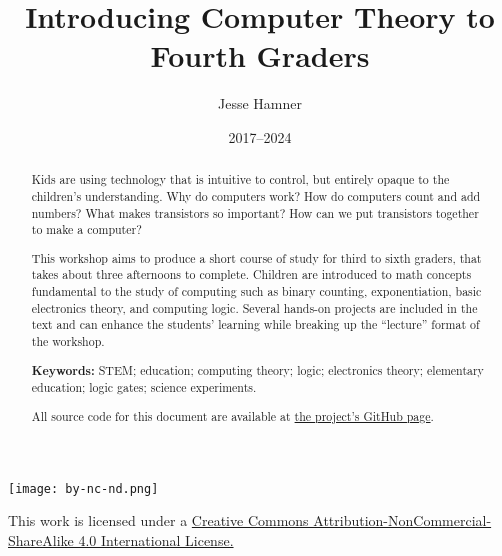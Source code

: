 \documentclass[12pt]{article}
\begin{document}

\thispagestyle{empty}

\title{Introducing Computer Theory to Fourth Graders}
\author{Jesse Hamner}
\date{2017--2024}

\maketitle

\begin{abstract}
Kids are using technology that is intuitive to control, but entirely opaque to the children's understanding. Why do computers work? How do computers count and add numbers? What makes transistors so important? How can we put transistors together to make a computer? 

This workshop aims to produce a short course of study for third to sixth graders, that takes about three afternoons to complete. Children are introduced to math concepts fundamental to the study of computing such as binary counting, exponentiation, basic electronics theory, and computing logic. Several hands-on projects are included in the text and can enhance the students' learning while breaking up the ``lecture'' format of the workshop.

\bigskip

\noindent\textbf{Keywords:} STEM; education; computing theory; logic; electronics theory; elementary education; logic gates; science experiments.

\bigskip

\noindent All source code for this document are available at {\color{webblue}\href{https://github.com/jessehamner/TechMillForKids}{the project's GitHub page}}.

\end{abstract}

\vfill

\begin{center}
\texttt{[image: by-nc-nd.png]}

This work is licensed under a {\color{webblue}\href{https://creativecommons.org/licenses/by-nc-sa/4.0/}{Creative Commons Attribution-NonCommercial-ShareAlike 4.0 International License.}}

\end{center}

\newpage
\tableofcontents
\end{document}
